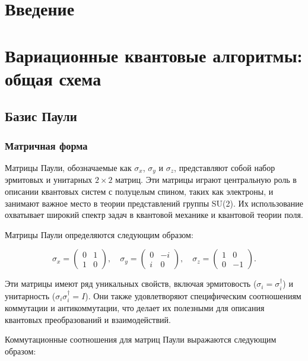 \documentclass[a4paper]{report}
\begin{document}
\setcounter{page}{2}

\tableofcontents
\newpage

\chapter*{Введение}

\chapter{Вариационные квантовые алгоритмы: общая схема}

\section{Базис Паули}

\subsection{Матричная форма}
Матрицы Паули, обозначаемые как $\sigma_x$, $\sigma_y$ и $\sigma_z$, представляют собой набор эрмитовых и унитарных $2 \times 2$ матриц. Эти матрицы играют центральную роль в описании квантовых систем с полуцелым спином, таких как электроны, и занимают важное место в теории представлений группы SU(2). Их использование охватывает широкий спектр задач в квантовой механике и квантовой теории поля.

Матрицы Паули определяются следующим образом:

$$
\sigma_x = \begin{pmatrix}
0 & 1 \\
1 & 0
\end{pmatrix}, \quad
\sigma_y = \begin{pmatrix}
0 & -i \\
i & 0
\end{pmatrix}, \quad
\sigma_z = \begin{pmatrix}
1 & 0 \\
0 & -1
\end{pmatrix}.
$$

Эти матрицы имеют ряд уникальных свойств, включая эрмитовость ($\sigma_i = \sigma_i^\dagger$) и унитарность ($\sigma_i \sigma_i^\dagger = I$). Они также удовлетворяют специфическим соотношениям коммутации и антикоммутации, что делает их полезными для описания квантовых преобразований и взаимодействий.

Коммутационные соотношения для матриц Паули выражаются следующим образом:
\end{document}
